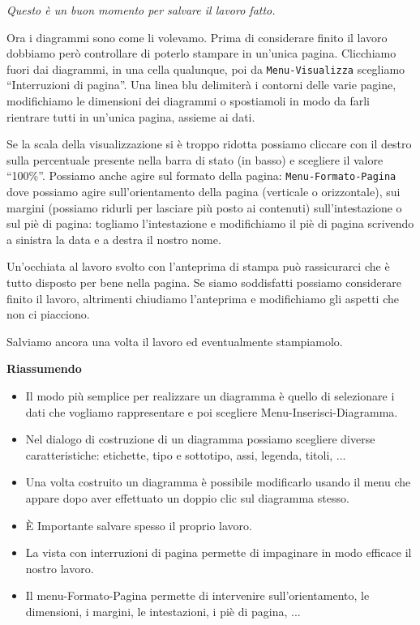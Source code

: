 \emph{Questo è un buon momento per salvare il lavoro fatto.}

Ora i diagrammi sono come li volevamo.
Prima di considerare finito il lavoro dobbiamo però controllare di poterlo
stampare in un'unica pagina.
Clicchiamo fuori dai diagrammi, in una cella qualunque,
poi da \texttt{Menu-Visualizza} scegliamo ``Interruzioni di pagina''.
Una linea blu delimiterà i contorni delle varie pagine, modifichiamo le
dimensioni dei diagrammi o spostiamoli in modo da farli rientrare tutti
in un'unica pagina, assieme ai dati.

Se la scala della visualizzazione si è troppo ridotta possiamo cliccare
con il destro sulla percentuale presente nella barra di stato (in basso)
e scegliere il valore ``100\%''. Possiamo anche agire sul formato della pagina:
\texttt{Menu-Formato-Pagina} dove possiamo agire sull'orientamento della pagina
(verticale o orizzontale), sui margini
(possiamo ridurli per lasciare più posto ai contenuti)
sull'intestazione o sul piè di pagina: togliamo l'intestazione e modifichiamo
il piè di pagina scrivendo a sinistra la data e a destra il nostro nome.

Un'occhiata al lavoro svolto con l'anteprima di stampa può rassicurarci che
è tutto disposto per bene nella pagina.
Se siamo soddisfatti possiamo considerare finito il lavoro, altrimenti
chiudiamo l'anteprima e modifichiamo gli aspetti che non ci piacciono.

Salviamo ancora una volta il lavoro ed eventualmente stampiamolo.

\textbf{Riassumendo}

\begin{itemize}
\item {} 
Il modo più semplice per realizzare un diagramma è quello di selezionare
i dati che vogliamo rappresentare e poi scegliere Menu-Inserisci-Diagramma.

\item {} 
Nel dialogo di costruzione di un diagramma possiamo scegliere diverse
caratteristiche: etichette, tipo e sottotipo, assi, legenda, titoli, ...

\item {} 
Una volta costruito un diagramma è possibile modificarlo usando il menu
che appare dopo aver effettuato un doppio clic sul diagramma stesso.

\item {} 
È Importante salvare spesso il proprio lavoro.

\item {} 
La vista con interruzioni di pagina permette di impaginare in modo efficace
il nostro lavoro.

\item {} 
Il menu-Formato-Pagina permette di intervenire sull'orientamento,
le dimensioni, i margini, le intestazioni, i piè di pagina, ...
\end{itemize}

